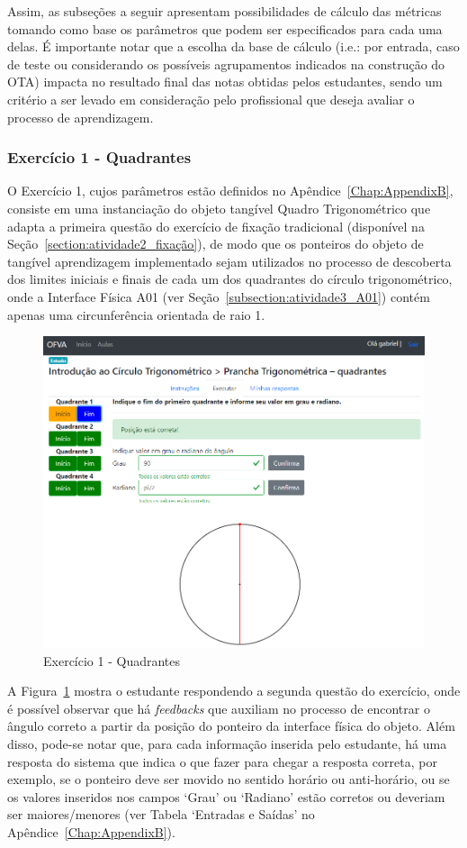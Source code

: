Assim, as subseções a seguir apresentam possibilidades de cálculo das métricas tomando como base os parâmetros que podem ser especificados para cada uma delas. É importante notar que a escolha da base de cálculo (i.e.: por entrada, caso de teste ou considerando os possíveis agrupamentos indicados na construção do OTA) impacta no resultado final das notas obtidas pelos estudantes, sendo um critério a ser levado em consideração pelo profissional que deseja avaliar o processo de aprendizagem.

\subsubsection{Exercício 1 - Quadrantes}\label{subsubsec:F3A1}

O Exercício 1, cujos parâmetros estão definidos no Apêndice~\ref{Chap:AppendixB}, consiste em uma instanciação do objeto tangível Quadro Trigonométrico que adapta a primeira questão do exercício de fixação tradicional (disponível na Seção~\ref{section:atividade2_fixação}), de modo que os ponteiros do objeto de tangível aprendizagem implementado sejam utilizados no processo de descoberta dos limites iniciais e finais de cada um dos quadrantes do círculo trigonométrico, onde a Interface Física A01 (ver Seção~\ref{subsection:atividade3_A01}) contém apenas uma circunferência orientada de raio 1.

\begin{figure}[htb]
	\centering
	\includegraphics[width=0.8\linewidth]{chapters/results/Fase 3/E1_Virtual_2.png}
	\caption{Exercício 1 - Quadrantes}
	\label{fig:E1}
\end{figure}

A Figura~\ref{fig:E1} mostra o estudante respondendo a segunda questão do exercício, onde é possível observar que há \textit{feedbacks} que auxiliam no processo de encontrar o ângulo correto a partir da posição do ponteiro da interface física do objeto. Além disso, pode-se notar que, para cada informação inserida pelo estudante, há uma resposta do sistema que indica o que fazer para chegar a resposta correta, por exemplo, se o ponteiro deve ser movido no sentido horário ou anti-horário, ou se os valores inseridos nos campos `Grau' ou `Radiano' estão corretos ou deveriam ser maiores/menores (ver Tabela `Entradas e Saídas' no Apêndice~\ref{Chap:AppendixB}). 

